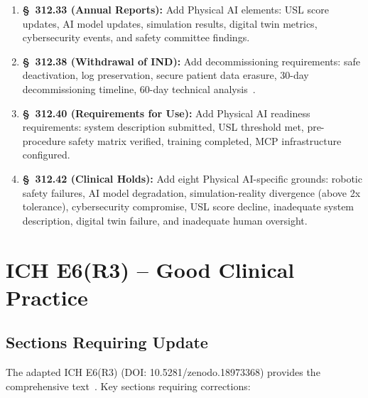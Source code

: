 \documentclass[11pt,letterpaper]{article}
\begin{document}
\begin{enumerate}[label=(\alph*)]
\item \textbf{\S~312.33 (Annual Reports):} Add Physical AI elements: USL
  score updates, AI model updates, simulation results, digital twin metrics,
  cybersecurity events, and safety committee findings.

\item \textbf{\S~312.38 (Withdrawal of IND):} Add decommissioning
  requirements: safe deactivation, log preservation, secure patient data
  erasure, 30-day decommissioning timeline, 60-day technical
  analysis~\cite{cfr312adapt}.

\item \textbf{\S~312.40 (Requirements for Use):} Add Physical AI readiness
  requirements: system description submitted, USL threshold met, pre-procedure
  safety matrix verified, training completed, MCP infrastructure configured.

\item \textbf{\S~312.42 (Clinical Holds):} Add eight Physical AI-specific
  grounds: robotic safety failures, AI model degradation, simulation-reality
  divergence (above 2x tolerance), cybersecurity compromise, USL score
  decline, inadequate system description, digital twin failure, and
  inadequate human oversight.
\end{enumerate}

\section{ICH E6(R3) -- Good Clinical Practice}

\subsection{Sections Requiring Update}

The adapted ICH E6(R3) (DOI: 10.5281/zenodo.18973368) provides the
comprehensive text~\cite{iche6r3adapt}. Key sections requiring corrections:
\end{document}
